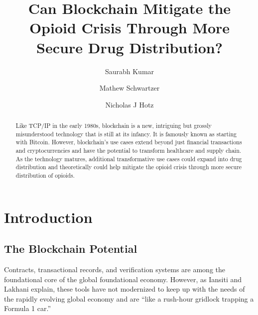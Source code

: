 \documentclass[sigconf]{acmart}
\begin{document}
\title{Can Blockchain Mitigate the Opioid Crisis Through More Secure Drug Distribution?}


\author{Saurabh Kumar}

\author{Mathew Schwartzer}

\author{Nicholas J Hotz}


\renewcommand{\shortauthors}{G. v. Laszewski}


\begin{abstract}
Like TCP/IP in the early 1980s, blockchain is a new, intriguing but grossly misunderstood technology that is still at its infancy. It is famously known as starting with Bitcoin. However, blockchain's use cases extend beyond just financial transactions and cryptocurrencies and have the potential to transform healthcare and supply chain. As the technology matures, additional transformative use cases could expand into drug distribution and theoretically could help mitigate the opioid crisis through more secure distribution of opioids.  
\end{abstract}



\maketitle



\section{Introduction}
\subsection{The Blockchain Potential}
Contracts, transactional records, and verification systems are among the foundational core of the global foundational economy. However, as Iansiti and Lakhani \cite{hbr} explain, these tools have not modernized to keep up with the needs of the rapidly evolving global economy and are ``like a rush-hour gridlock trapping a Formula 1 car.''
\end{document}
